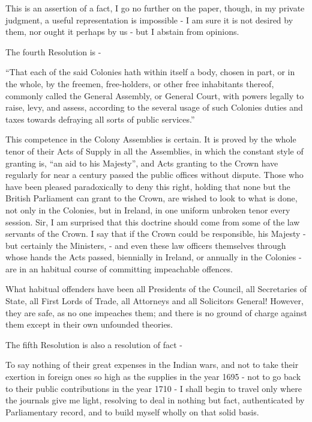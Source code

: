 This is an assertion of a fact, I go no further on the paper, though, in my private judgment, a useful representation is impossible - I am sure it is not desired by them, nor ought it perhaps by us - but I abstain from opinions.\par

The fourth Resolution is -\par

“That each of the said Colonies hath within itself a body, chosen in part, or in the whole, by the freemen, free-holders, or other free inhabitants thereof, commonly called the General Assembly, or General Court, with powers legally to raise, levy, and assess, according to the several usage of such Colonies duties and taxes towards defraying all sorts of public services.”\par

This competence in the Colony Assemblies is certain. It is proved by the whole tenor of their Acts of Supply in all the Assemblies, in which the constant style of granting is, “an aid to his Majesty”, and Acts granting to the Crown have regularly for near a century passed the public offices without dispute. Those who have been pleased paradoxically to deny this right, holding that none but the British Parliament can grant to the Crown, are wished to look to what is done, not only in the Colonies, but in Ireland, in one uniform unbroken tenor every session. Sir, I am surprised that this doctrine should come from some of the law servants of the Crown. I say that if the Crown could be responsible, his Majesty - but certainly the Ministers, - and even these law officers themselves through whose hands the Acts passed, biennially in Ireland, or annually in the Colonies - are in an habitual course of committing impeachable offences.\par

What habitual offenders have been all Presidents of the Council, all Secretaries of State, all First Lords of Trade, all Attorneys and all Solicitors General! However, they are safe, as no one impeaches them; and there is no ground of charge against them except in their own unfounded theories.\par

The fifth Resolution is also a resolution of fact -\par

To say nothing of their great expenses in the Indian wars, and not to take their exertion in foreign ones so high as the supplies in the year 1695 - not to go back to their public contributions in the year 1710 - I shall begin to travel only where the journals give me light, resolving to deal in nothing but fact, authenticated by Parliamentary record, and to build myself wholly on that solid basis.\par

